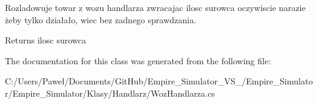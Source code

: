 Rozladowuje towar z wozu handlarza zwracajac ilosc surowca oczywiscie narazie żeby tylko działało, wiec bez zadnego sprawdzania. 

\begin{DoxyReturn}{Returns}
ilosc surowca
\end{DoxyReturn}


The documentation for this class was generated from the following file\+:\begin{DoxyCompactItemize}
\item 
C\+:/\+Users/\+Paweł/\+Documents/\+Git\+Hub/\+Empire\+\_\+\+Simulator\+\_\+\+V\+S\+\_/\+Empire\+\_\+\+Simulator/\+Empire\+\_\+\+Simulator/\+Klasy/\+Handlarz/Woz\+Handlarza.\+cs\end{DoxyCompactItemize}
